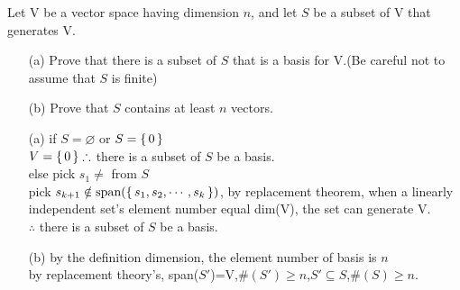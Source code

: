 Let V be a vector space having dimension $n$, and let $S$ be a subset of V that generates V.

	\begin{enumerate}
		\item[(a)] Prove that there is a subset of $S$ that is a basis for V.(Be careful not to assume that $S$ is finite)
		\item[(b)] Prove that $S$ contains at least $n$ vectors.
	\end{enumerate}
\begin{tcolorbox}
	\begin{solution}
		\begin{enumerate}
			\item[(a)] if $S = \varnothing$ or $S = \left\{ \,0 \,\right\}$\\
			$V = \left\{ \,0 \,\right\} \therefore $ there is a subset of $S$ be a basis.\\
			else pick $s_1 \neq$ from $S$\\
			pick $s_{k+1} \notin \text{span($\left\{ \,s_1,s_2,\cdots,s_k \,\right\}$)}$, by replacement theorem, when a linearly independent set's element number equal dim(V), the set can generate V.\\
			$\therefore$ there is a subset of $S$ be a basis.
			\item[(b)] by the definition dimension, the element number of basis is $n$\\
			by replacement theory's, span($S'$)=V,$\#(S') \geq n$,$S' \subseteq S$,$\#(S) \geq n$.
		\end{enumerate}
	\end{solution}
\end{tcolorbox}